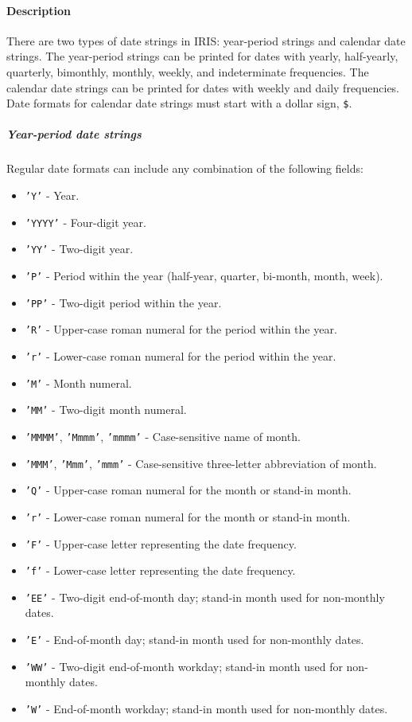 \paragraph{Description}

There are two types of date strings in IRIS: year-period strings and
calendar date strings. The year-period strings can be printed for dates
with yearly, half-yearly, quarterly, bimonthly, monthly, weekly, and
indeterminate frequencies. The calendar date strings can be printed for
dates with weekly and daily frequencies. Date formats for calendar date
strings must start with a dollar sign, \texttt{\$}.

\subparagraph{Year-period date strings}

Regular date formats can include any combination of the following
fields:

\begin{itemize}
\item
  \texttt{'Y'} - Year.
\item
  \texttt{'YYYY'} - Four-digit year.
\item
  \texttt{'YY'} - Two-digit year.
\item
  \texttt{'P'} - Period within the year (half-year, quarter, bi-month,
  month, week).
\item
  \texttt{'PP'} - Two-digit period within the year.
\item
  \texttt{'R'} - Upper-case roman numeral for the period within the
  year.
\item
  \texttt{'r'} - Lower-case roman numeral for the period within the
  year.
\item
  \texttt{'M'} - Month numeral.
\item
  \texttt{'MM'} - Two-digit month numeral.
\item
  \texttt{'MMMM'}, \texttt{'Mmmm'}, \texttt{'mmmm'} - Case-sensitive
  name of month.
\item
  \texttt{'MMM'}, \texttt{'Mmm'}, \texttt{'mmm'} - Case-sensitive
  three-letter abbreviation of month.
\item
  \texttt{'Q'} - Upper-case roman numeral for the month or stand-in
  month.
\item
  \texttt{'r'} - Lower-case roman numeral for the month or stand-in
  month.
\item
  \texttt{'F'} - Upper-case letter representing the date frequency.
\item
  \texttt{'f'} - Lower-case letter representing the date frequency.
\item
  \texttt{'EE'} - Two-digit end-of-month day; stand-in month used for
  non-monthly dates.
\item
  \texttt{'E'} - End-of-month day; stand-in month used for non-monthly
  dates.
\item
  \texttt{'WW'} - Two-digit end-of-month workday; stand-in month used
  for non-monthly dates.
\item
  \texttt{'W'} - End-of-month workday; stand-in month used for
  non-monthly dates.
\end{itemize}

